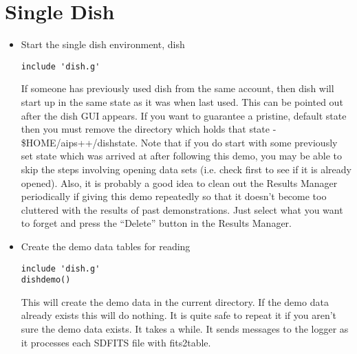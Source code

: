 \section{Single Dish}

\begin{itemize}
\item Start the single dish environment, dish
\begin{verbatim}
include 'dish.g'
\end{verbatim}
If someone has previously used dish from the same account, then dish
will start up in the same state as it was when last used.  This can
be pointed out after the dish GUI appears.  If you want to guarantee
a pristine, default state then you must remove the directory which
holds that state - \$HOME/aips++/dishstate.  Note that if you do start with
some previously set state which was arrived at after following this
demo, you may be able to skip the steps involving opening data sets
(i.e. check first to see if it is already opened).  Also, it is probably
a good idea to clean out the Results Manager periodically if giving
this demo repeatedly so that it doesn't become too cluttered with the
results of past demonstrations.  Just select what you want to forget
and press the ``Delete'' button in the Results Manager.
\item Create the demo data tables for reading
\begin{verbatim}
include 'dish.g'
dishdemo()
\end{verbatim}
This will create the demo data in the current directory.  If the demo data 
already exists this will do nothing. It is quite safe to repeat it
if you aren't sure the demo data exists.  It takes a while.  It sends
messages to the logger as it processes each SDFITS file
with fits2table.


\end{itemize}

